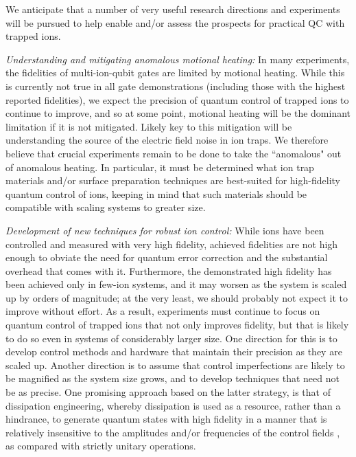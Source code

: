 \documentclass[%
reprint,
 amsmath,amssymb,
]{revtex4-1}
\begin{document}
We anticipate that a number of very useful research directions and experiments will be pursued to help enable and/or assess the prospects for practical QC with trapped ions.

\textit{Understanding and mitigating anomalous motional heating:} In many experiments, the fidelities of multi-ion-qubit gates are limited by motional heating.  While this is currently not true in all gate demonstrations (including those with the highest reported fidelities), we expect the precision of quantum control of trapped ions to continue to improve, and so at some point, motional heating will be the dominant limitation if it is not mitigated.  Likely key to this mitigation will be understanding the source of the electric field noise in ion traps.  We therefore believe that crucial experiments remain to be done to take the ``anomalous" out of anomalous heating.  In particular, it must be determined what ion trap materials and/or surface preparation techniques are best-suited for high-fidelity quantum control of ions, keeping in mind that such materials should be compatible with scaling systems to greater size.

\textit{Development of new techniques for robust ion control:} While ions have been controlled and measured with very high fidelity, achieved fidelities are not high enough to obviate the need for quantum error correction and the substantial overhead that comes with it.  Furthermore, the demonstrated high fidelity has been achieved only in few-ion systems, and it may worsen as the system is scaled up by orders of magnitude; at the very least, we should probably not expect it to improve without effort.  As a result, experiments must continue to focus on quantum control of trapped ions that not only improves fidelity, but that is likely to do so even in systems of considerably larger size.  One direction for this is to develop control methods and hardware that maintain their precision as they are scaled up.  Another direction is to assume that control imperfections are likely to be magnified as the system size grows, and to develop techniques that need not be as precise.  One promising approach based on the latter strategy, is that of dissipation engineering, whereby dissipation is used as a resource, rather than a hindrance, to generate quantum states with high fidelity in a manner that is relatively insensitive to the amplitudes and/or frequencies of the control fields \cite{PoyatosDE1996, LinDE2013}, as compared with strictly unitary operations.
\end{document}
